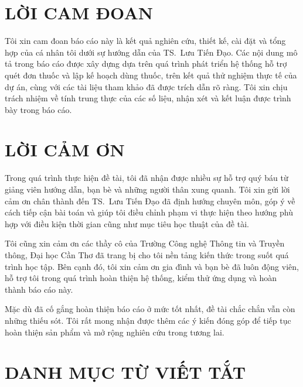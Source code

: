 \documentclass[12pt,a4paper]{report}
\newcommand{\gvhd}{TS.\ Lưu Tiến Đạo}
\begin{document}
\hypersetup{pageanchor=true}


\chapter*{LỜI CAM ĐOAN}

Tôi xin cam đoan báo cáo này là kết quả nghiên cứu, thiết kế, cài đặt và tổng hợp của cá nhân tôi dưới sự hướng dẫn của \gvhd. Các nội dung mô tả trong báo cáo được xây dựng dựa trên quá trình phát triển hệ thống hỗ trợ quét đơn thuốc và lập kế hoạch dùng thuốc, trên kết quả thử nghiệm thực tế của dự án, cùng với các tài liệu tham khảo đã được trích dẫn rõ ràng. Tôi xin chịu trách nhiệm về tính trung thực của các số liệu, nhận xét và kết luận được trình bày trong báo cáo.

\chapter*{LỜI CẢM ƠN}

Trong quá trình thực hiện đề tài, tôi đã nhận được nhiều sự hỗ trợ quý báu từ giảng viên hướng dẫn, bạn bè và những người thân xung quanh. Tôi xin gửi lời cảm ơn chân thành đến \gvhd{} đã định hướng chuyên môn, góp ý về cách tiếp cận bài toán và giúp tôi điều chỉnh phạm vi thực hiện theo hướng phù hợp với điều kiện thời gian cũng như mục tiêu học thuật của đề tài.

Tôi cũng xin cảm ơn các thầy cô của Trường Công nghệ Thông tin và Truyền thông, Đại học Cần Thơ đã trang bị cho tôi nền tảng kiến thức trong suốt quá trình học tập. Bên cạnh đó, tôi xin cảm ơn gia đình và bạn bè đã luôn động viên, hỗ trợ tôi trong quá trình hoàn thiện hệ thống, kiểm thử ứng dụng và hoàn thành báo cáo này.

Mặc dù đã cố gắng hoàn thiện báo cáo ở mức tốt nhất, đề tài chắc chắn vẫn còn những thiếu sót. Tôi rất mong nhận được thêm các ý kiến đóng góp để tiếp tục hoàn thiện sản phẩm và mở rộng nghiên cứu trong tương lai.

\tableofcontents
\clearpage
\listoffigures
\clearpage
\listoftables
\clearpage

\chapter*{DANH MỤC TỪ VIẾT TẮT}
\end{document}
